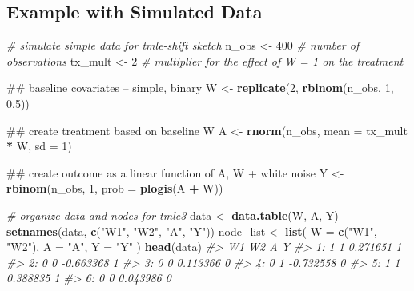 \documentclass[12pt, krantz2,]{book}
\newenvironment{Shaded}{\begin{snugshade}}{\end{snugshade}}
\newcommand{\CommentTok}[1]{\textcolor[rgb]{0.56,0.35,0.01}{\textit{#1}}}
\newcommand{\DataTypeTok}[1]{\textcolor[rgb]{0.13,0.29,0.53}{#1}}
\newcommand{\DecValTok}[1]{\textcolor[rgb]{0.00,0.00,0.81}{#1}}
\newcommand{\FloatTok}[1]{\textcolor[rgb]{0.00,0.00,0.81}{#1}}
\newcommand{\KeywordTok}[1]{\textcolor[rgb]{0.13,0.29,0.53}{\textbf{#1}}}
\newcommand{\NormalTok}[1]{#1}
\newcommand{\OperatorTok}[1]{\textcolor[rgb]{0.81,0.36,0.00}{\textbf{#1}}}
\newcommand{\StringTok}[1]{\textcolor[rgb]{0.31,0.60,0.02}{#1}}
\theoremstyle{definition}
\theoremstyle{definition}
\theoremstyle{definition}
\newcommand{\1}{\mathbbm{1}}
\begin{document}
\hypertarget{example-with-simulated-data}{%
\subsection{Example with Simulated Data}\label{example-with-simulated-data}}

\begin{Shaded}
\begin{Highlighting}[]
\CommentTok{# simulate simple data for tmle-shift sketch}
\NormalTok{n_obs <-}\StringTok{ }\DecValTok{400} \CommentTok{# number of observations}
\NormalTok{tx_mult <-}\StringTok{ }\DecValTok{2} \CommentTok{# multiplier for the effect of W = 1 on the treatment}

\NormalTok{## baseline covariates -- simple, binary}
\NormalTok{W <-}\StringTok{ }\KeywordTok{replicate}\NormalTok{(}\DecValTok{2}\NormalTok{, }\KeywordTok{rbinom}\NormalTok{(n_obs, }\DecValTok{1}\NormalTok{, }\FloatTok{0.5}\NormalTok{))}

\NormalTok{## create treatment based on baseline W}
\NormalTok{A <-}\StringTok{ }\KeywordTok{rnorm}\NormalTok{(n_obs, }\DataTypeTok{mean =}\NormalTok{ tx_mult }\OperatorTok{*}\StringTok{ }\NormalTok{W, }\DataTypeTok{sd =} \DecValTok{1}\NormalTok{)}

\NormalTok{## create outcome as a linear function of A, W + white noise}
\NormalTok{Y <-}\StringTok{ }\KeywordTok{rbinom}\NormalTok{(n_obs, }\DecValTok{1}\NormalTok{, }\DataTypeTok{prob =} \KeywordTok{plogis}\NormalTok{(A }\OperatorTok{+}\StringTok{ }\NormalTok{W))}

\CommentTok{# organize data and nodes for tmle3}
\NormalTok{data <-}\StringTok{ }\KeywordTok{data.table}\NormalTok{(W, A, Y)}
\KeywordTok{setnames}\NormalTok{(data, }\KeywordTok{c}\NormalTok{(}\StringTok{"W1"}\NormalTok{, }\StringTok{"W2"}\NormalTok{, }\StringTok{"A"}\NormalTok{, }\StringTok{"Y"}\NormalTok{))}
\NormalTok{node_list <-}\StringTok{ }\KeywordTok{list}\NormalTok{(}
  \DataTypeTok{W =} \KeywordTok{c}\NormalTok{(}\StringTok{"W1"}\NormalTok{, }\StringTok{"W2"}\NormalTok{),}
  \DataTypeTok{A =} \StringTok{"A"}\NormalTok{,}
  \DataTypeTok{Y =} \StringTok{"Y"}
\NormalTok{)}
\KeywordTok{head}\NormalTok{(data)}
\CommentTok{#>    W1 W2         A Y}
\CommentTok{#> 1:  1  1  0.271651 1}
\CommentTok{#> 2:  0  0 -0.663368 1}
\CommentTok{#> 3:  0  0  0.113366 0}
\CommentTok{#> 4:  0  1 -0.732558 0}
\CommentTok{#> 5:  1  1  0.388835 1}
\CommentTok{#> 6:  0  0  0.043986 0}
\end{Highlighting}
\end{Shaded}
\end{document}
